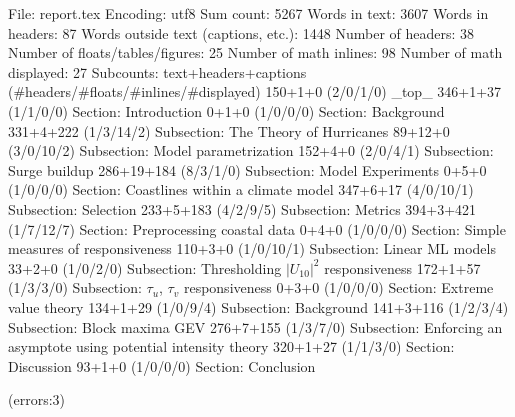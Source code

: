 
File: report.tex
Encoding: utf8
Sum count: 5267
Words in text: 3607
Words in headers: 87
Words outside text (captions, etc.): 1448
Number of headers: 38
Number of floats/tables/figures: 25
Number of math inlines: 98
Number of math displayed: 27
Subcounts:
  text+headers+captions (#headers/#floats/#inlines/#displayed)
  150+1+0 (2/0/1/0) _top_
  346+1+37 (1/1/0/0) Section: Introduction
  0+1+0 (1/0/0/0) Section: Background
  331+4+222 (1/3/14/2) Subsection: The Theory of Hurricanes
  89+12+0 (3/0/10/2) Subsection: Model parametrization
  152+4+0 (2/0/4/1) Subsection: Surge buildup
  286+19+184 (8/3/1/0) Subsection: Model Experiments
  0+5+0 (1/0/0/0) Section: Coastlines within a climate model
  347+6+17 (4/0/10/1) Subsection: Selection
  233+5+183 (4/2/9/5) Subsection: Metrics
  394+3+421 (1/7/12/7) Section: Preprocessing coastal data
  0+4+0 (1/0/0/0) Section: Simple measures of responsiveness
  110+3+0 (1/0/10/1) Subsection: Linear ML models
  33+2+0 (1/0/2/0) Subsection: Thresholding $|U_{10}|^2$ responsiveness
  172+1+57 (1/3/3/0) Subsection: $\tau_u$, $\tau_v$ responsiveness
  0+3+0 (1/0/0/0) Section: Extreme value theory
  134+1+29 (1/0/9/4) Subsection: Background
  141+3+116 (1/2/3/4) Subsection: Block maxima GEV
  276+7+155 (1/3/7/0) Subsection: Enforcing an asymptote using potential intensity theory 
  320+1+27 (1/1/3/0) Section: Discussion
  93+1+0 (1/0/0/0) Section: Conclusion

(errors:3)
